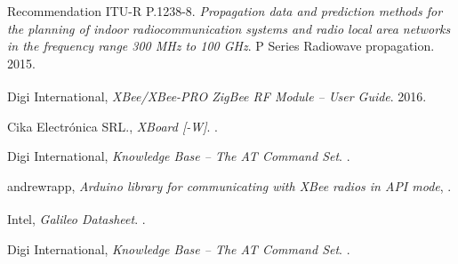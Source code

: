 \documentclass[11pt,oneside,spanish,a4paper]{article}
\begin{document}
\begin{thebibliography}{1}

 Recommendation ITU-R P.1238-8.
\emph{Propagation data and prediction methods
for the planning of indoor
radiocommunication systems and
radio local area networks in the
frequency range 300 MHz to 100 GHz}.
P Series Radiowave propagation. 2015.

  Digi International,
  \emph{XBee\textsuperscript{\textregistered{}}/XBee-PRO
    ZigBee\textsuperscript{\textregistered{}} RF Module -- User
    Guide}. 2016.
  
  Cika Electrónica SRL.,
  \emph{XBoard [-W]}.
  .

  Digi International,
  \emph{Knowledge Base -- The AT Command Set}.
  .

  andrewrapp,
\emph{Arduino library for communicating with XBee radios in API mode},
.

  Intel\textsuperscript{\textregistered{}},
  \emph{Galileo Datasheet}.
  .

Digi International,
\emph{Knowledge Base -- The AT Command Set}.
.
\end{thebibliography}



% 

% 


% 
\end{document}
